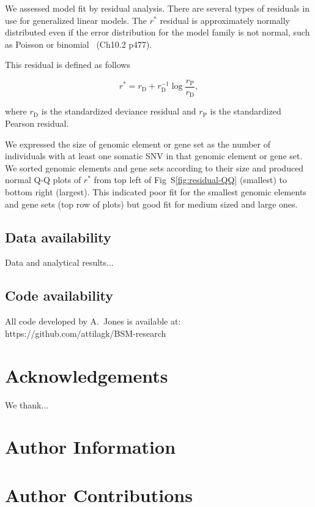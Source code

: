 \documentclass[letterpaper]{article}
\begin{document}
We assessed model fit by residual analysis.  There are several types of residuals in use for generalized linear models.
The $r^\ast$ residual is approximately normally distributed even if the error
distribution for the model family is not normal, such as Poisson or
binomial~\citep{davison2003statistical} (Ch10.2 p477).

This residual is defined as follows

$$
r^\ast = r_\mathrm{D} + r_\mathrm{D}^{-1} \log
\frac{r_\mathrm{P}}{r_\mathrm{D}},
$$

where \(r_\mathrm{D}\) is the standardized deviance residual and
\(r_\mathrm{P}\) is the standardized Pearson residual.

We expressed the size of genomic element or gene set as the number of
individuals with at least one somatic SNV in that genomic element or gene set.
We sorted genomic elements and gene sets according to their size and produced
normal Q-Q plots of \(r^\ast\) from top left of Fig~S\ref{fig:residual-QQ} (smallest) to
bottom right (largest).  This indicated poor fit for the smallest genomic
elements and gene sets (top row of plots) but good fit for medium sized and
large ones.

\subsection*{Data availability}

Data and analytical results...

\subsection*{Code availability}

All code developed by A.~Jones is available at:\\
https://github.com/attilagk/BSM-research


%


\section*{Acknowledgements}

We thank...

\section*{Author Information}

\section*{Author Contributions}
\end{document}
